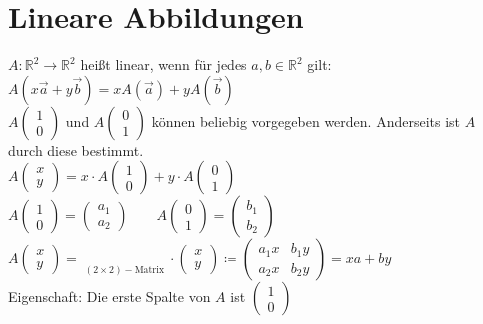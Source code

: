 \section{Lineare Abbildungen}
$A: \mathbb{R}^{2} \rightarrow \mathbb{R}^{2}$ heißt linear, wenn für jedes $a,b \in \mathbb{R}^{2}$ gilt: $A(x\vec{a} + y \vec{b})=xA(\vec{a}) + yA(\vec{b})$\\

$A\begin{pmatrix} 1\\0 \end{pmatrix}$ und $A\begin{pmatrix} 0 \\ 1 \end{pmatrix}$ können beliebig vorgegeben werden. Anderseits ist $A$ durch diese bestimmt.\\

$A\begin{pmatrix} x \\ y \end{pmatrix}= x\cdot A\begin{pmatrix} 1 \\ 0 \end{pmatrix} + y \cdot A\begin{pmatrix} 0 \\ 1 \end{pmatrix}$ \\

$A\begin{pmatrix}1 \\ 0 \end{pmatrix} = \begin{pmatrix} a_{1} \\ a_{2} \end{pmatrix} \qquad A\begin{pmatrix} 0 \\ 1 \end{pmatrix} = \begin{pmatrix} b_{1} \\ b_{2} \end{pmatrix}$ \\

$A\begin{pmatrix} x \\ y \end{pmatrix} = \mathop{\underbrace{\begin{pmatrix} a_{1} & b_{1} \\ a_{2} & b_{2} \end{pmatrix}}}\limits_{(2\times 2) - \textrm{Matrix}} \cdot \begin{pmatrix} x \\ y \end{pmatrix} \coloneq \begin{pmatrix} a_{1}x & b_{1} y \\ a_{2}x & b_{2}y\end{pmatrix} = xa+by$\\
Eigenschaft: Die erste Spalte von $A$ ist $\begin{pmatrix}1 \\ 0 \end{pmatrix}$
%
%
%

